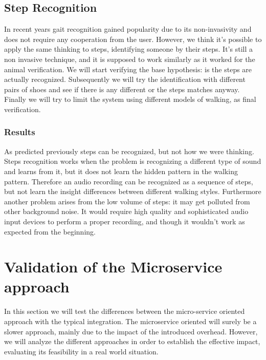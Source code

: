 \subsection{Step Recognition}

In recent years gait recognition gained popularity due to its
non-invasivity and does not require any cooperation from the user.
However, we think it's possible to apply the same thinking to steps,
identifying someone by their steps. It's still a non invasive technique,
and it is supposed to work similarly as it worked for the animal verification.
We will start verifying the base hypothesis: is the steps are actually recognized.
Subsequently we will try the identification with different pairs of shoes and see if
there is any different or the steps matches anyway. Finally we will try to limit the system
using different models of walking, as final verification.

\subsubsection{Results}

As predicted previously steps can be recognized, but not how we were thinking.
Steps recognition works when the problem is recognizing a different type of sound and learns from it,
but it does not learn the hidden pattern in the walking pattern. Therefore an audio recording can be
recognized as a sequence of steps, but not learn the insight differences between different walking
styles.\newline
Furthermore another problem arises from the low volume of steps: it may get polluted from other background noise.
It would require high quality and sophisticated audio input devices to perform a proper recording,
and though it wouldn't work as expected from the beginning.

\section{Validation of the Microservice approach}
\label{micro-validation}

In this section we will test the differences between the micro-service
oriented approach with the typical integration. The microservice oriented
will surely be a slower approach, mainly due to the impact of the introduced
overhead. However, we will analyze the different approaches in order to establish
the effective impact, evaluating its feasibility in a real world situation.



